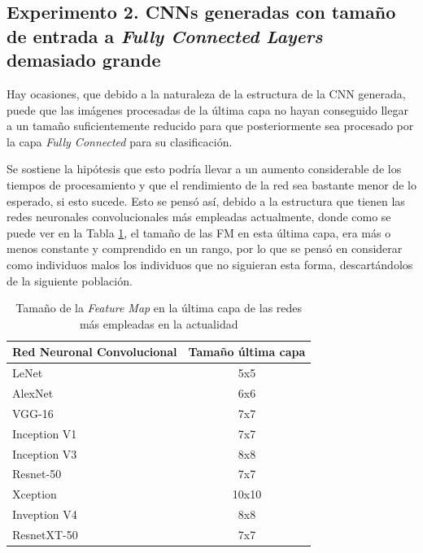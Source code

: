 \subsection{Experimento 2. CNNs generadas con tamaño de entrada a \textit{Fully Connected Layers} demasiado grande}

Hay ocasiones, que debido a la naturaleza de la estructura de la CNN generada, puede que las imágenes procesadas de la última capa no hayan conseguido llegar a un tamaño suficientemente reducido para que posteriormente sea procesado por la capa \textit{Fully Connected} para su clasificación. 

Se sostiene la hipótesis que esto podría llevar a un aumento considerable de los tiempos de procesamiento y que el rendimiento de la red sea bastante menor de lo esperado, si esto sucede. Esto se pensó así, debido a la estructura que tienen las redes neuronales convolucionales más empleadas actualmente, donde como se puede ver en la Tabla \ref{tab:ultima_capa_redes}, el tamaño de las FM en esta última capa, era más o menos constante y comprendido en un rango, por lo que se pensó en considerar como individuos malos los individuos que no siguieran esta forma, descartándolos de la siguiente población.

\begin{table}[h]
\caption{Tamaño de la \textit{Feature Map} en la última capa de las redes más empleadas en la actualidad}
\label{tab:ultima_capa_redes}
\centering
\begin{tabular}{l|c}
\toprule
\textbf{Red Neuronal Convolucional} & \multicolumn{1}{l}{\textbf{Tamaño última capa}} \\ \hline
LeNet \cite{lesnet}                             & 5x5      \\
AlexNet \cite{NIPS2012_c399862d}                            & 6x6  \\
VGG-16 \cite{simonyan2015deep}                             & 7x7 \\
Inception V1 \cite{szegedy2014going}                       & 7x7 \\
Inception V3 \cite{szegedy2015rethinking}                       & 8x8   \\
Resnet-50 \cite{He2016}                          & 7x7                                             \\
Xception \cite{chollet2017xception}                           & 10x10  \\
Inveption V4 \cite{szegedy2016inceptionv4}                       & 8x8 \\
ResnetXT-50 \cite{xie2017aggregated}                        & 7x7      \\
\bottomrule
\end{tabular}
\end{table}

